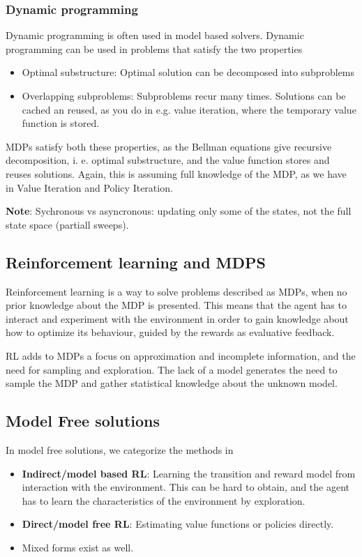 \subsubsection{Dynamic programming}

Dynamic programming is often used in model based solvers. Dynamic programming can be used in problems that satisfy the two properties

\begin{itemize}
    \item Optimal substructure: Optimal solution can be decomposed into subproblems
    \item Overlapping subproblems: Subproblems recur many times. Solutions can be cached an reused, as you do in e.g. value iteration, where the temporary value function is stored. 
\end{itemize}

MDPs satisfy both these properties, as the Bellman equations give recursive decomposition, i. e. optimal substructure, and the value function stores and reuses solutions. Again, this is assuming full knowledge of the MDP, as we have in Value Iteration and Policy Iteration.


\textbf{Note}: Sychronous vs asyncronous: updating only some of the states, not the full state space (partiall sweeps).


\subsection{Reinforcement learning and MDPS}
Reinforcement learning is a way to solve problems described as MDPs, when
no prior knowledge about the MDP is presented. This means that the agent has to interact and experiment with the environment in order to gain knowledge about how to optimize its behaviour, guided by the rewards as evaluative feedback.

RL adds to MDPs a focus on approximation and incomplete information, and the need for sampling and exploration. The lack of a model generates the need to sample the MDP and gather statistical knowledge about the unknown model.

\subsection{Model Free solutions}

In model free solutions, we categorize the methods in

\begin{itemize}
    \item \textbf{Indirect/model based RL}: Learning the transition and reward model from interaction with the environment. This can be hard to obtain, and the agent has to learn the characteristics of the environment by exploration.
    \item \textbf{Direct/model free RL}: Estimating value functions or policies directly. 
    \item Mixed forms exist as well.
\end{itemize}

